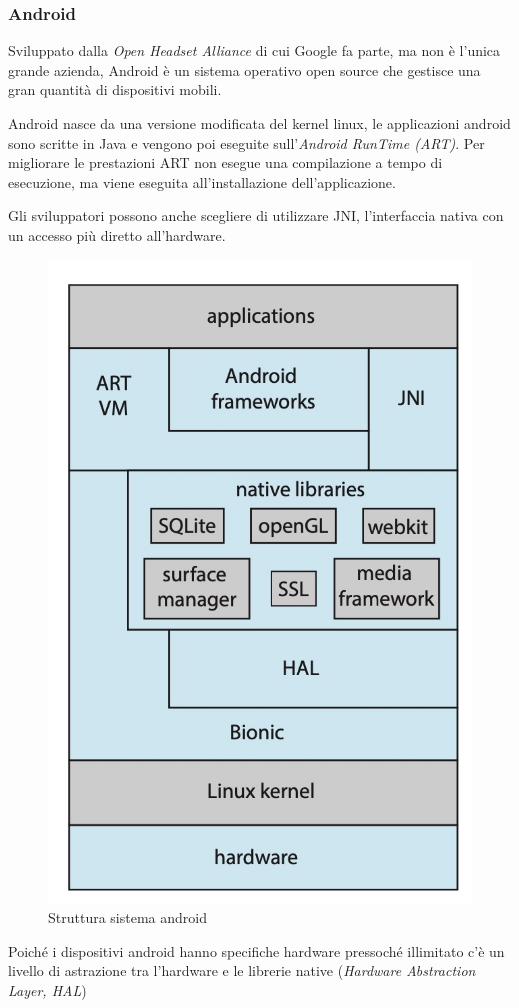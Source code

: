 \subsubsection*{Android}
Sviluppato dalla \textit{Open Headset Alliance} di cui Google fa parte, ma non è l'unica grande azienda, Android è un sistema operativo open source che gestisce una gran quantità di dispositivi mobili.

\spacer

Android nasce da una versione modificata del kernel linux, le applicazioni android sono scritte in Java e vengono poi eseguite sull'\textit{Android RunTime (ART)}.
Per migliorare le prestazioni ART non esegue una compilazione a tempo di esecuzione, ma viene eseguita all'installazione dell'applicazione.

Gli sviluppatori possono anche scegliere di utilizzare JNI, l'interfaccia nativa con un accesso più diretto all'hardware.

\begin{figure}[H]
    \centering
    \includegraphics[width=0.27\linewidth]{assets/android.jpg}
    \caption{Struttura sistema android}
\end{figure}

\begin{note}
    Poiché i dispositivi android hanno specifiche hardware pressoché illimitato c'è un livello di astrazione tra l'hardware e le librerie native (\textit{Hardware Abstraction Layer, HAL})
\end{note}

